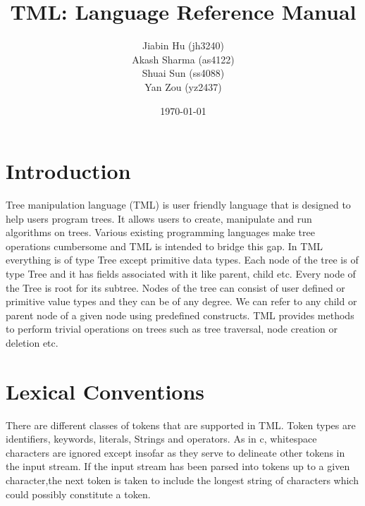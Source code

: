 \documentclass[12pt,psfig,a4]{article}
\begin{document}
 
\pagestyle{plain} 
\newenvironment{code}
{\sffamily
 \setlength{\parskip}{0pt}
}
{}


\title{TML: Language Reference Manual}
\author{
Jiabin Hu (jh3240)\\
Akash Sharma (as4122)\\
Shuai Sun (ss4088)\\
Yan Zou (yz2437)
}
\date{\today}
\maketitle





\section{Introduction}

Tree manipulation language (TML) is user friendly language that is designed to help users program trees. It allows users to create, manipulate and run algorithms on trees. Various existing programming languages make tree operations cumbersome and TML is intended to bridge this gap. In TML everything is of type Tree except primitive data types. Each node of the tree is of type Tree and it has fields associated with it like parent, child etc. Every node of the Tree is root for its subtree. Nodes of the tree can consist of user defined or primitive value types and they can be of any degree. We can refer to any child or parent node of a given node using predefined constructs. TML provides methods to perform trivial operations on trees such as tree traversal, node creation or deletion etc.

\section{Lexical Conventions} \label{lexCon}
There are different classes of tokens that are supported in TML. Token types are identifiers, keywords, literals, Strings and operators. As in c, whitespace characters are ignored except insofar as they serve to delineate other tokens in the input stream. If the input stream has been parsed into tokens up to a given character,the next token is taken to include the longest string of characters which could possibly constitute a token.
\end{document}
